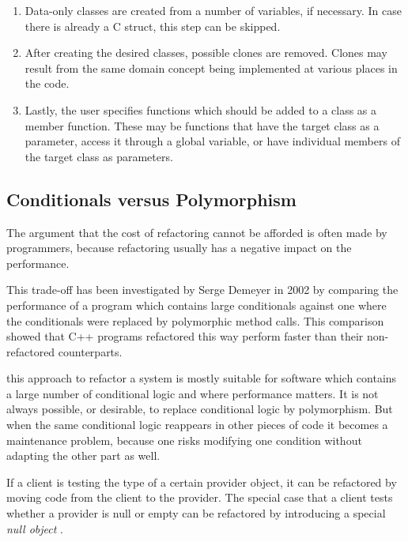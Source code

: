 \documentclass[conference,compsoc,a4paper]{IEEEtran}
\newcommand{\code}[1]{{\small\ttfamily #1}}
\begin{document}
\begin{enumerate}
  \item Data-only classes are created from a number of variables, if necessary. In case there is already a C 
  \code{struct}, this step can be skipped.
  
  \item After creating the desired classes, possible clones are removed. Clones may result from the same domain concept 
  being implemented at various places in the code.
  
  \item Lastly, the user specifies functions which should be added to a class as a member function. These may be 
  functions that have the target class as a parameter, access it through a global variable, or have individual members 
  of the target class as parameters.
\end{enumerate}

\subsection{Conditionals versus Polymorphism}

The argument that the cost of refactoring cannot be afforded is often made by programmers, because refactoring usually 
has a negative impact on the performance.

This trade-off has been investigated by Serge Demeyer in 2002 \cite{polymorphism} by comparing the performance of a 
program which contains large conditionals against one where the conditionals were replaced by polymorphic method calls. 
This comparison showed that C++ programs refactored this way perform faster than their non-refactored counterparts.

this approach to refactor a system is mostly suitable for software which contains a large number of conditional logic 
and where performance matters. It is not always possible, or desirable, to replace conditional logic by polymorphism. 
But when the same conditional logic reappears in other pieces of code it becomes a maintenance problem, because one 
risks modifying one condition without adapting the other part as well.

If a client is testing the type of a certain provider object, it can be refactored by moving code from the client to 
the provider. The special case that a client tests whether a provider is \code{null} or empty can be refactored by 
introducing a special \emph{null object} \cite{nullobject}.
\end{document}
